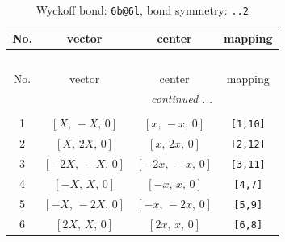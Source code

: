 \documentclass[fleqn,8pt]{jsarticle}
\begin{document}
\begin{longtable}{cccc}
\caption{Wyckoff bond: {\tt 6b@6l}, bond symmetry: {\tt ..2}}
 \\
 \hline \hline
No. & vector & center & mapping \\ \hline \endfirsthead

\multicolumn{3}{l}{\tablename\ \thetable{}} \\
 \hline \hline
No. & vector & center & mapping \\ \hline \endhead

 \hline \hline
\multicolumn{3}{r}{\footnotesize\it continued ...} \\ \endfoot

 \hline \hline
\multicolumn{3}{r}{} \\ \endlastfoot

1 & $\left[ X,\, - X,\, 0 \right]$ & $\left[ x,\, - x,\, 0 \right]$ & {\tt [1,10]} \\ \hline
2 & $\left[ X,\, 2 X,\, 0 \right]$ & $\left[ x,\, 2 x,\, 0 \right]$ & {\tt [2,12]} \\ \hline
3 & $\left[ - 2 X,\, - X,\, 0 \right]$ & $\left[ - 2 x,\, - x,\, 0 \right]$ & {\tt [3,11]} \\ \hline
4 & $\left[ - X,\, X,\, 0 \right]$ & $\left[ - x,\, x,\, 0 \right]$ & {\tt [4,7]} \\ \hline
5 & $\left[ - X,\, - 2 X,\, 0 \right]$ & $\left[ - x,\, - 2 x,\, 0 \right]$ & {\tt [5,9]} \\ \hline
6 & $\left[ 2 X,\, X,\, 0 \right]$ & $\left[ 2 x,\, x,\, 0 \right]$ & {\tt [6,8]} \\
\end{longtable}
\renewcommand{\arraystretch}{1.2}
\end{document}
